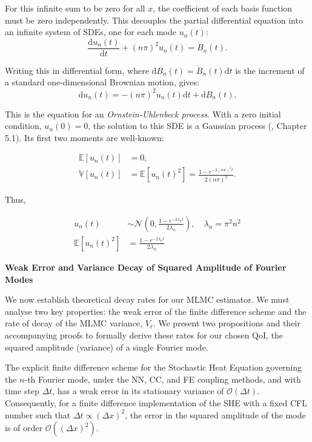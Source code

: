 For
this infinite sum to be zero for all $x$, the coefficient of each basis
function must be zero independently. This decouples the partial differential 
equation into an infinite system of SDEs, one for each mode 
$u_n(t)$: 
$$\frac{\mathrm{d}u_n(t)}{\mathrm{d}t} + (n\pi)^2 u_n(t) = \dot{B}_n(t).$$

Writing this in differential form, where $\mathrm{d}B_n(t) = 
\dot{B}_n(t)\mathrm{d}t$ is the 
increment of a standard one-dimensional Brownian motion, 
gives:
$$
\mathrm{d}u_n(t) = -(n\pi)^2 u_n(t)\mathrm{d}t + \mathrm{d}B_n(t).
$$ 

This is the equation for an \textit{Ornstein-Uhlenbeck process}.
With a zero initial condition, $u_n(0)=0$, the solution to 
this SDE is a Gaussian process (\cite{oksendal2013stochastic}, Chapter 5.1). 
Its first two moments are well-known:

\begin{align}\label{eq:moments_of_fourier_modes}
\mathbb{E}[u_n(t)] &= 0, \\
\mathbb{V}[u_n(t)] &= \mathbb{E}[u_n(t)^2] = 
 \frac{1 - e^{-2(n\pi)^2 t}}{2(n\pi)^2}. \label{eq:var_fourier_modes}
\end{align}

Thus,

\begin{align}
    u_n(t) &\sim \mathcal{N}(0, 
    \frac{1-e^{-2\lambda_nt}}{2\lambda_n}), 
    \quad \lambda_n = \pi^2 n^2
    \nonumber
    \\
    \mathbb{E}\left[u_n(t)^2\right] &= \frac{1 - e^{-2\lambda_nt}}{2\lambda_n}
    \label{eq:squared_amplitude_analytic}
\end{align}
\newline

\textbf{Weak Error and Variance Decay of Squared Amplitude of Fourier Modes}

We now establish theoretical decay
rates for our MLMC estimator. We must analyse two key properties:
the weak error of the finite difference scheme and the rate 
of decay of the MLMC variance, $V_\ell$. We present 
two propositions and their accompanying proofs to formally 
derive these rates for our chosen QoI, the squared amplitude (variance)
of a single Fourier mode. 

\begin{proposition}
    \label{prop:weak_error_for_fourier_mode}
    The explicit finite difference scheme for the Stochastic Heat Equation
    governing the $n$-th Fourier mode, under the NN, CC, and FE coupling 
    methods, and with time step $\Delta t$, has a weak error 
    in its stationary variance of 
    $\mathcal{O}(\Delta t)$. Consequently, for a finite difference 
    implementation of the SHE with a fixed CFL number such that 
    $\Delta t \propto (\Delta x)^2$, the error in the squared amplitude of the mode 
    is of order $\mathcal{O}((\Delta x)^2)$. 
\end{proposition}

